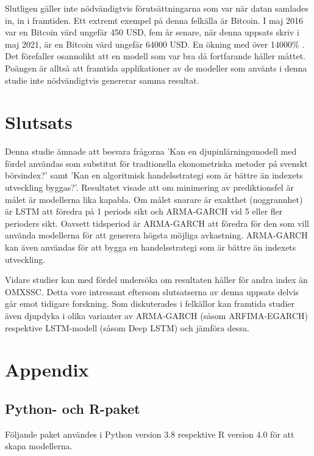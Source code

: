 \documentclass[11pt]{article}
\numberwithin{equation}{section}
\numberwithin{table}{section}
\numberwithin{figure}{section}
\begin{document}
Slutligen gäller inte nödvändigtvis förutsättningarna som var när datan samlades in, in i framtiden. Ett extremt exempel på denna felkälla är Bitcoin. I maj 2016 var en Bitcoin värd ungefär 450 USD, fem år senare, när denna uppsats skriv i maj 2021, är en Bitcoin värd ungefär 64000 USD. En ökning med över 14000\% \parencite{yahoo_bitcoin}. Det förefaller osannolikt att en modell som var bra då fortfarande håller måttet. Poängen är alltså att framtida applikationer av de modeller som använts i denna studie inte nödvändigtvis genererar samma resultat.

\newpage
\section{Slutsats}
Denna studie ämnade att besvara frågorna 'Kan en djupinlärningsmodell med fördel användas som substitut för tradtionella ekonometriska metoder på svenskt börsindex?' samt 'Kan en algoritmisk handelsstrategi som är bättre än indexets utveckling byggas?'. Resultatet visade att om minimering av prediktionsfel är målet är modellerna lika kapabla. Om målet snarare är exakthet (noggrannhet) är LSTM att föredra på 1 periods sikt och ARMA-GARCH vid 5 eller fler perioders sikt. Oavsett tidsperiod är ARMA-GARCH att föredra för den som vill använda modellerna för att generera högsta möjliga avkastning. ARMA-GARCH kan även användas för att bygga en handelsstrategi som är bättre än indexets utveckling.

Vidare studier kan med fördel undersöka om resultaten håller för andra index än OMXSSC. Detta vore intressant eftersom slutsatserna av denna uppsats delvis går emot tidigare forskning. Som diskuterades i felkällor kan framtida studier även djupdyka i olika varianter av ARMA-GARCH (såsom ARFIMA-EGARCH) respektive LSTM-modell (såsom Deep LSTM) och jämföra dessa.



\newpage

\appendix
\section*{Appendix}
\renewcommand{\thesubsection}{\Alph{subsection}}

\subsection{Python- och R-paket}
Följande paket användes i Python version 3.8 respektive R version 4.0 för att skapa modellerna. 
\end{document}
